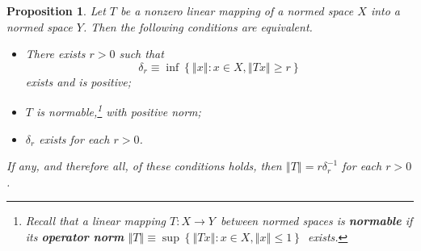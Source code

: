 \documentclass[10pt,a4paper]{amsart}
\newtheorem{proposition}{Proposition}
\begin{document}
\begin{proposition}
\label{apr20p1}Let $T$ be a nonzero linear mapping of a normed space $X$ into
a normed space $Y$. Then the following conditions are equivalent.

\begin{itemize}
\item[\emph{(a)}] There exists $r>0$ such that%
\[
\delta_{r}\equiv\inf\left\{  \left\Vert x\right\Vert :x\in X,\left\Vert
Tx\right\Vert \geq r\right\}
\]
exists and is positive;

\item[\emph{(b)}] $T$ is normable,\footnote{%
\normalfont\sf
\textsf{Recall that a linear mapping }$T:X\rightarrow Y$\textsf{\ between
normed spaces is \textbf{normable} if its \textbf{operator norm} }$\left\Vert
T\right\Vert \equiv\sup\left\{  \left\Vert Tx\right\Vert :x\in X,\left\Vert
x\right\Vert \leq1\right\}  $\textsf{\ exists.}} with positive norm;

\item[\emph{(c)}] $\delta_{r}$ exists for each $r>0$.
\end{itemize}

%

\noindent
If any, and therefore all, of these conditions holds, then $\left\Vert
T\right\Vert =r\delta_{r}^{-1}$ for each $r>0$.
\end{proposition}
\end{document}

